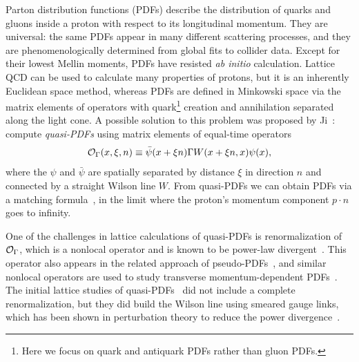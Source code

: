 Parton distribution functions (PDFs) describe the distribution of
quarks and gluons inside a proton with respect to its longitudinal
momentum. They are universal: the same PDFs appear in many different
scattering processes, and they are phenomenologically determined from
global fits to collider data. Except for their lowest Mellin moments,
PDFs have resisted \emph{ab initio} calculation. Lattice QCD can be
used to calculate many properties of protons, but it is an inherently
Euclidean space method, whereas PDFs are defined in Minkowski space
via the matrix elements of operators with quark\footnote{Here we focus
  on quark and antiquark PDFs rather than gluon PDFs.} creation and
annihilation separated along the light cone. A possible solution to
this problem was proposed by Ji~\cite{Ji:2013dva}: compute
\emph{quasi-PDFs} using matrix elements of equal-time operators
\begin{equation}
  \mathcal{O}_\Gamma(x,\xi,n) \equiv
  \bar\psi(x+\xi n) \Gamma W(x+\xi n,x)\psi(x),
\end{equation}
where the $\psi$ and $\bar\psi$ are spatially separated by distance
$\xi$ in direction $n$ and connected by a straight Wilson line
$W$. From quasi-PDFs we can obtain PDFs via a matching
formula~\cite{Xiong:2013bka,Alexandrou:2015rja}, in the limit where
the proton's momentum component $p\cdot n$ goes to infinity.

One of the challenges in lattice calculations of quasi-PDFs is
renormalization of $\mathcal{O}_\Gamma$, which is a nonlocal operator and is
known to be power-law divergent~\cite{Ishikawa:2016znu,Chen:2016fxx}.
This operator also appears in the related approach of
pseudo-PDFs~\cite{Radyushkin:2017cyf,Orginos:2017kos}, and similar
nonlocal operators are used to study transverse momentum-dependent
PDFs~\cite{Musch:2011er,Engelhardt:2015xja,Yoon:2017qzo}.
The initial lattice studies of
quasi-PDFs~\cite{Lin:2014zya,Alexandrou:2015rja,Chen:2016utp,Alexandrou:2016jqi}
did not include a complete renormalization, but they did build the
Wilson line using smeared gauge links, which has been shown in
perturbation theory to reduce the power
divergence~\cite{Ishikawa:2016znu}.

